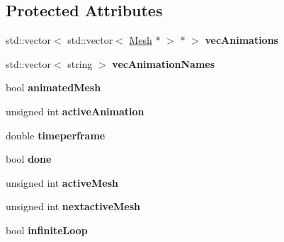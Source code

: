 \subsection*{Protected Attributes}
\begin{DoxyCompactItemize}
\item 
std\+::vector$<$ std\+::vector$<$ \hyperlink{classMesh}{Mesh} $\ast$ $>$ $\ast$ $>$ {\bfseries vec\+Animations}\hypertarget{classMeshAnimation_a3628b8cfdb70732b80b45174c4d58d04}{}\label{classMeshAnimation_a3628b8cfdb70732b80b45174c4d58d04}

\item 
std\+::vector$<$ string $>$ {\bfseries vec\+Animation\+Names}\hypertarget{classMeshAnimation_aa1bc2a2aa26b89e3ecfe880f94df4db1}{}\label{classMeshAnimation_aa1bc2a2aa26b89e3ecfe880f94df4db1}

\item 
bool {\bfseries animated\+Mesh}\hypertarget{classMeshAnimation_ad1cacb200fa8f6efe6da96e99aa7218e}{}\label{classMeshAnimation_ad1cacb200fa8f6efe6da96e99aa7218e}

\item 
unsigned int {\bfseries active\+Animation}\hypertarget{classMeshAnimation_ab2c652eba7967e36f3ab66a313949dc4}{}\label{classMeshAnimation_ab2c652eba7967e36f3ab66a313949dc4}

\item 
double {\bfseries timeperframe}\hypertarget{classMeshAnimation_a421bec11dcbb84aa7d3f5d07d774fef3}{}\label{classMeshAnimation_a421bec11dcbb84aa7d3f5d07d774fef3}

\item 
bool {\bfseries done}\hypertarget{classMeshAnimation_aacd635ad003beaccae183d613298f757}{}\label{classMeshAnimation_aacd635ad003beaccae183d613298f757}

\item 
unsigned int {\bfseries active\+Mesh}\hypertarget{classMeshAnimation_a1f0c9dc8dfadb4b225a735087091347b}{}\label{classMeshAnimation_a1f0c9dc8dfadb4b225a735087091347b}

\item 
unsigned int {\bfseries nextactive\+Mesh}\hypertarget{classMeshAnimation_a120f1eef3967297d9afd652ca73121b7}{}\label{classMeshAnimation_a120f1eef3967297d9afd652ca73121b7}

\item 
bool {\bfseries infinite\+Loop}\hypertarget{classMeshAnimation_a491f4ce60dbc04ea75c447c465d6211e}{}\label{classMeshAnimation_a491f4ce60dbc04ea75c447c465d6211e}


\end{DoxyCompactItemize}
